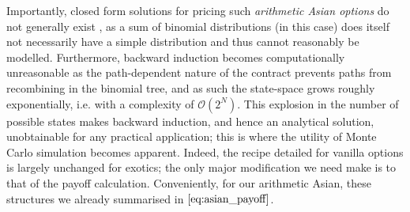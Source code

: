 \documentclass[]{article}
\theoremstyle{remark}
\theoremstyle{plain}
\begin{document}
Importantly, closed form solutions for pricing such \textit{arithmetic Asian options} do not generally exist \cite{KEMNA_1990}, as a sum of binomial distributions (in this case) does itself not necessarily have a simple distribution \cite{BINOMIAL_SUM} and thus cannot reasonably be modelled. Furthermore, backward induction becomes computationally unreasonable as the path-dependent nature of the contract prevents paths from recombining in the binomial tree, and as such the state-space grows roughly exponentially, i.e. with a complexity of $\mathcal{O}(2^N)$. This explosion in the number of possible states makes backward induction, and hence an analytical solution, unobtainable for any practical application; this is where the utility of Monte Carlo simulation becomes apparent. Indeed, the recipe detailed for vanilla options is largely unchanged for exotics; the only major modification we need make is to that of the payoff calculation. Conveniently, for our arithmetic Asian, these structures we already summarised in $\cref{eq:asian_payoff}$.
\end{document}
